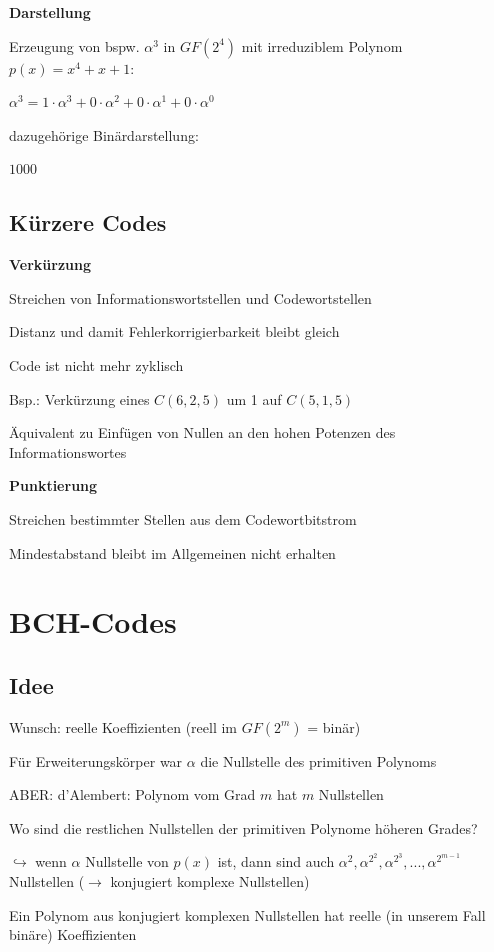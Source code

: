 \textbf{Darstellung}

Erzeugung von bspw. $\alpha^3$ in $GF(2^4)$ mit irreduziblem Polynom $p(x) = x^4 + x + 1$:

$\displaystyle{
    \alpha^3 = 1 \cdot \alpha^3 + 0 \cdot \alpha^2 + 0 \cdot \alpha^1 + 0 \cdot \alpha^0
}$

dazugehörige Binärdarstellung:

$1000$

\subsection{Kürzere Codes}

\textbf{Verkürzung}

Streichen von Informationswortstellen und Codewortstellen

Distanz und damit Fehlerkorrigierbarkeit bleibt gleich

Code ist nicht mehr zyklisch

Bsp.: Verkürzung eines $C(6, 2, 5)$ um 1 auf $C(5, 1, 5)$

Äquivalent zu Einfügen von Nullen an den hohen Potenzen des Informationswortes

\textbf{Punktierung}

Streichen bestimmter Stellen aus dem Codewortbitstrom

Mindestabstand bleibt im Allgemeinen nicht erhalten

\section{BCH-Codes}

\subsection{Idee}

Wunsch: reelle Koeffizienten (reell im $GF(2^m)$ = binär)

Für Erweiterungskörper war $\alpha$ die Nullstelle des primitiven Polynoms

ABER: d'Alembert: Polynom vom Grad $m$ hat $m$ Nullstellen

Wo sind die restlichen Nullstellen der primitiven Polynome höheren Grades?

$\hookrightarrow$ wenn $\alpha$ Nullstelle von $p(x)$ ist, dann sind auch $\alpha^2, \alpha^{2^2}, \alpha^{2^3}, ..., \alpha^{2^{m-1}}$
Nullstellen ($\rightarrow$ konjugiert komplexe Nullstellen)

Ein Polynom aus konjugiert komplexen Nullstellen hat reelle (in unserem Fall binäre) Koeffizienten


